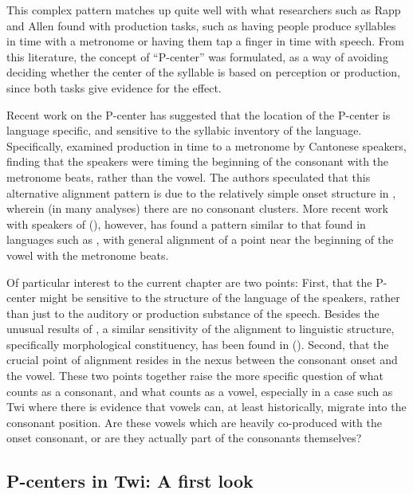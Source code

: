 \documentclass[output=paper,colorlinks,citecolor=brown]{langscibook}
\begin{document}
This complex pattern matches up quite well with what researchers such as Rapp and Allen found with production tasks, such as having people produce syllables in time with a metronome or having them tap a finger in time with speech. From this literature, the concept of “P-center” was formulated, as a way of avoiding deciding whether the center of the syllable is based on perception or production, since both tasks give evidence for the effect.

Recent work on the P-center has suggested that the location of the P-center is language specific, and sensitive to the syllabic inventory of the language. Specifically, \citet{Chowetal2015} examined production in time to a metronome by Cantonese speakers, finding that the speakers were timing the beginning of the consonant with the metronome beats, rather than the vowel. The authors speculated that this alternative alignment pattern is due to the relatively simple onset structure in , wherein (in many analyses) there are no consonant clusters. More recent work with speakers of  (\citealt{Lin_deJong2023}), however, has found a pattern similar to that found in languages such as , with general alignment of a point near the beginning of the vowel with the metronome beats. 

Of particular interest to the current chapter are two points: First, that the P-center might be sensitive to the structure of the language of the speakers, rather than just to the auditory or production substance of the speech. Besides the unusual results of \citet{Chowetal2015}, a similar sensitivity of the  alignment to linguistic structure, specifically morphological constituency, has been found in  (\cite{Franich2018}). Second, that the crucial point of alignment resides in the nexus between the consonant onset and the vowel. These two points together raise the more specific question of what counts as a consonant, and what counts as a vowel, especially in a case such as Twi where there is evidence that vowels can, at least historically, migrate into the consonant position. Are these vowels which are heavily co-produced with the onset consonant, or are they actually part of the consonants themselves? 


\subsection{P-centers in Twi: A first look}
\end{document}
